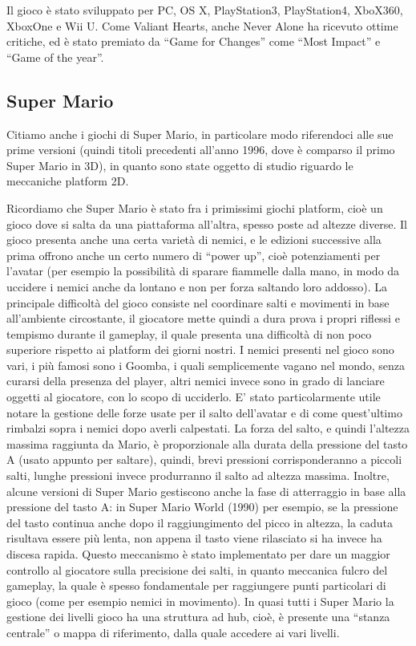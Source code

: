 Il gioco è stato sviluppato per PC, OS X, PlayStation3, PlayStation4, XboX360, XboxOne e Wii U. Come Valiant Hearts, anche Never Alone ha ricevuto ottime critiche, ed è stato premiato da ``Game for Changes'' come ``Most Impact'' e ``Game of the year''.



\subsection{Super Mario}
\label{sec:stato_arte_super_mario}

Citiamo anche i giochi di Super Mario, in particolare modo riferendoci alle sue prime versioni (quindi titoli precedenti all'anno 1996, dove è comparso il primo Super Mario in 3D), in quanto sono state oggetto di studio riguardo le meccaniche platform 2D.

Ricordiamo che Super Mario è stato fra i primissimi giochi platform, cioè un gioco dove si salta da una piattaforma all'altra, spesso poste ad altezze diverse. Il gioco presenta anche una certa varietà di nemici, e le edizioni successive alla prima offrono anche un certo numero di ``power up'', cioè potenziamenti per l'avatar (per esempio la possibilità di sparare fiammelle dalla mano, in modo da uccidere i nemici anche da lontano e non per forza saltando loro addosso).
La principale difficoltà del gioco consiste nel coordinare salti e movimenti in base all'ambiente circostante, il giocatore mette quindi a dura prova i propri riflessi e tempismo durante il gameplay, il quale presenta una difficoltà di non poco superiore rispetto ai platform dei giorni nostri. I nemici presenti nel gioco sono vari, i più famosi sono i Goomba, i quali semplicemente vagano nel mondo, senza curarsi della presenza del player, altri nemici invece sono in grado di lanciare oggetti al giocatore, con lo scopo di ucciderlo.
E' stato particolarmente utile notare la gestione delle forze usate per il salto dell'avatar e di come quest'ultimo rimbalzi sopra i nemici dopo averli calpestati. La forza del salto, e quindi l'altezza massima raggiunta da Mario, è proporzionale alla durata della pressione del tasto A (usato appunto per saltare), quindi, brevi pressioni corrisponderanno a piccoli salti, lunghe pressioni invece produrranno il salto ad altezza massima. Inoltre, alcune versioni di Super Mario gestiscono anche la fase di atterraggio in base alla pressione del tasto A: in Super Mario World (1990)  per esempio, se la pressione del tasto continua anche dopo il raggiungimento del picco in altezza, la caduta risultava essere più lenta, non appena il tasto viene rilasciato si ha invece ha discesa rapida. Questo meccanismo è stato implementato per dare un maggior controllo al giocatore sulla precisione dei salti, in quanto meccanica fulcro del gameplay, la quale è spesso fondamentale per raggiungere punti particolari di gioco (come per esempio nemici in movimento).
In quasi tutti i Super Mario la gestione dei livelli gioco ha una struttura ad hub, cioè, è presente una ``stanza centrale'' o mappa di riferimento, dalla quale accedere ai vari livelli.

